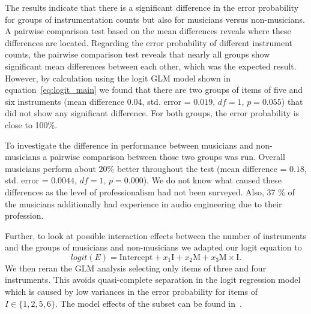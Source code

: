 \par
The results indicate that there is a significant difference in the error probability for groups of instrumentation counts but also for musicians versus non-musicians. A pairwise comparison test based on the mean differences reveals where these differences are located. Regarding the error probability of different instrument counts, the pairwise comparison test reveals that nearly all groups show significant mean differences between each other, which was the expected result. However, by calculation using the logit GLM model shown in equation~\ref{eq:logit_main} we found that there are two groups of items of five and six instruments (mean difference $0.04$, std. error = $0.019$, $df = 1$, $p = 0.055$) that did not show any significant difference. For both groups, the error probability is close to 100\%.
\par
To investigate the difference in performance between musicians and non-musicians a pairwise comparison between those two groups was run. Overall musicians perform about 20\% better throughout the test (mean difference = $0.18$, std. error = $ 0.0044$, $df = 1$, $p=0.000$). We do not know what caused these differences as the level of professionalism had not been surveyed. Also, 37 \% of the musicians additionally had experience in audio engineering due to their profession.
\par
Further, to look at possible interaction effects between the number of instruments and the groups of musicians and non-musicians we adapted our logit equation to
\begin{equation}
    logit(E) =  \text{Intercept} + x_1 \text{I} + x_2 \text{M} + x_3 \text{M}\times\text{I} .
    \label{eq:logit_interactions}
\end{equation}
We then reran the GLM analysis selecting only items of three and four instruments. This avoids quasi-complete separation in the logit regression model which is caused by low variances in the error probability for items of $I \in \{1,2,5,6\}$.
The model effects of the subset can be found in~\cite{stoeter13}.

